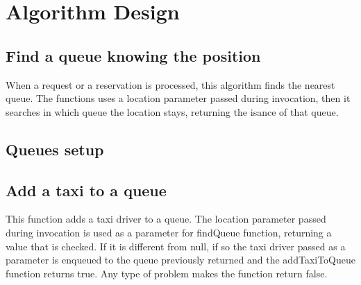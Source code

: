 \section{Algorithm Design}
\label{sec:algo}
\subsection{Find a queue knowing the position}
\begin{algorithm}[H]
	 {
		\BlankLine
		\;
	}
\end{algorithm}
When a request or a reservation is processed, this algorithm finds the nearest queue. The functions uses a location parameter passed during invocation, then it searches in which queue the location stays, returning the isance of that queue.
\subsection{Queues setup}
\begin{algorithm}[H]
	\myfun{\qSetup{}} {
		
	}
\end{algorithm}
\subsection{Add a taxi to a queue}
\begin{algorithm}[H]
\end{algorithm}
This function adds a taxi driver to a queue. The location parameter passed during invocation is used as a parameter for findQueue function, returning a value that is checked. If it is different from null, if so the taxi driver passed as a parameter is enqueued to the queue previously returned and the addTaxiToQueue function returns true. Any type of problem makes the function return false.  
